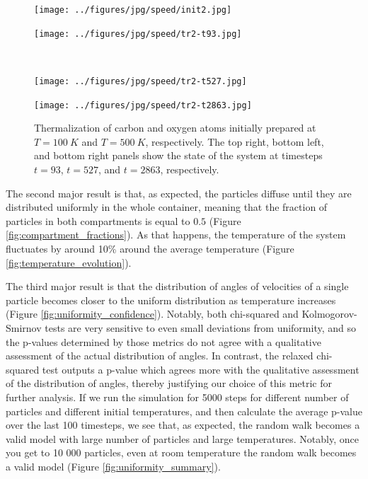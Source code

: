 \documentclass[10pt]{article}
\begin{document}
\begin{figure}[h]
    \centering
    \begin{minipage}{0.4\linewidth}
        \texttt{[image: ../figures/jpg/speed/init2.jpg]}
    \end{minipage}
    \begin{minipage}{0.4\linewidth}
        \texttt{[image: ../figures/jpg/speed/tr2-t93.jpg]}
    \end{minipage} \\
    \begin{minipage}{0.4\linewidth}
        \texttt{[image: ../figures/jpg/speed/tr2-t527.jpg]}
    \end{minipage}
    \begin{minipage}{0.4\linewidth}
        \texttt{[image: ../figures/jpg/speed/tr2-t2863.jpg]}
    \end{minipage}
    \caption{Thermalization of carbon and oxygen atoms initially prepared at $T=\qty{100}{K}$ and $T=\qty{500}{K}$, respectively. The top right, bottom left, and bottom right panels show the state of the system at timesteps $t=93$, $t=527$, and $t=2863$, respectively.}
    \label{fig:speed_thermalization}
\end{figure}

The second major result is that, as expected, the particles diffuse until they are distributed uniformly in the whole container, meaning that the fraction of particles in both compartments is equal to $0.5$ (Figure \ref{fig:compartment_fractions}). As that happens, the temperature of the system fluctuates by around 10\% around the average temperature (Figure \ref{fig:temperature_evolution}).

The third major result is that the distribution of angles of velocities of a single particle becomes closer to the uniform distribution as temperature increases (Figure \ref{fig:uniformity_confidence}). Notably, both chi-squared and Kolmogorov-Smirnov tests are very sensitive to even small deviations from uniformity, and so the p-values determined by those metrics do not agree with a qualitative assessment of the actual distribution of angles. In contrast, the relaxed chi-squared test outputs a p-value which agrees more with the qualitative assessment of the distribution of angles, thereby justifying our choice of this metric for further analysis. If we run the simulation for 5000 steps for different number of particles and different initial temperatures, and then calculate the average p-value over the last 100 timesteps, we see that, as expected, the random walk becomes a valid model with large number of particles and large temperatures. Notably, once you get to 10 000 particles, even at room temperature the random walk becomes a valid model (Figure \ref{fig:uniformity_summary}).
\end{document}

